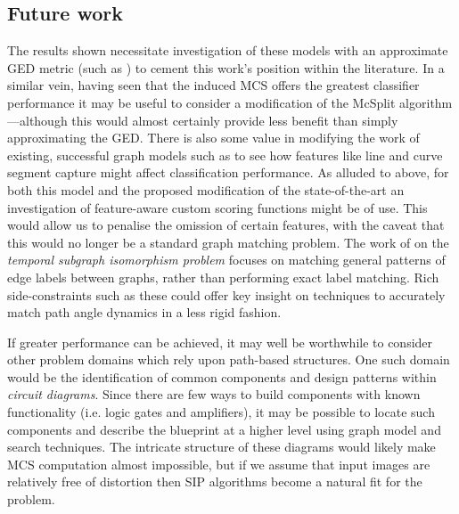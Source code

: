 \documentclass{mpaper}
\begin{document}
\subsection{Future work}
The results shown necessitate investigation of these models with an approximate GED metric (such as \citeauthor{GED-Approx} \cite{GED-Approx}) to cement this work's position within the literature.
In a similar vein, having seen that the induced MCS offers the greatest classifier performance it may be useful to consider a modification of the McSplit algorithm \cite{MCS-McSplit}---although this would almost certainly provide less benefit than simply approximating the GED.
There is also some value in modifying the work of existing, successful graph models such as \citeauthor{Graphs-Handwriting} \cite{Graphs-Handwriting} to see how features like line and curve segment capture might affect classification performance.
As alluded to above, for both this model and the proposed modification of the state-of-the-art an investigation of feature-aware custom scoring functions might be of use.
This would allow us to penalise the omission of certain features, with the caveat that this would no longer be a standard graph matching problem.
The work of \citeauthor{TSIP-Long} \cite{TSIP-Long} on the \emph{temporal subgraph isomorphism problem} focuses on matching general patterns of edge labels between graphs, rather than performing exact label matching.
Rich side-constraints such as these could offer key insight on techniques to accurately match path angle dynamics in a less rigid fashion.


If greater performance can be achieved, it may well be worthwhile to consider other problem domains which rely upon path-based structures.
One such domain would be the identification of common components and design patterns within \emph{circuit diagrams}.
Since there are few ways to build components with known functionality (i.e. logic gates and amplifiers), it may be possible to locate such components and describe the blueprint at a higher level using graph model and search techniques.
The intricate structure of these diagrams would likely make MCS computation almost impossible, but if we assume that input images are relatively free of distortion then SIP algorithms become a natural fit for the problem.
\end{document}
